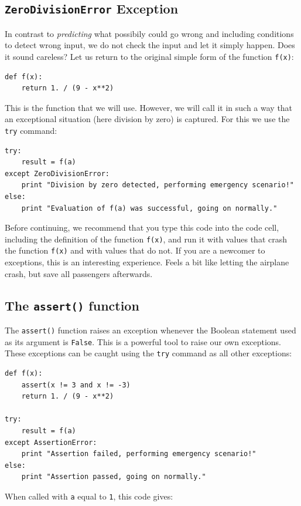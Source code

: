 \subsection{{\tt ZeroDivisionError} Exception}

In contrast 
to {\em predicting} what possibily could go wrong and including conditions to detect wrong 
input, we do not check the input and let it simply happen. Does it sound careless? Let us 
return to the original simple form of the function {\tt f(x)}:

\begin{verbatim}
def f(x):
    return 1. / (9 - x**2)
\end{verbatim}
This is the function that we will use. However, we will call it in such a way that 
an exceptional situation (here division by zero) is captured. For this we use the 
{\tt try} command:
 
\begin{verbatim}
try:
    result = f(a)
except ZeroDivisionError:
    print "Division by zero detected, performing emergency scenario!"
else:
    print "Evaluation of f(a) was successful, going on normally."
\end{verbatim}
Before continuing, we recommend that you type this code into the code cell,
including the definition of the function {\tt f(x)}, and run it with values
that crash the function {\tt f(x)} and with values that do not. If you are a newcomer to
exceptions, this is an interesting experience. Feels a bit like letting the
airplane crash, but save all passengers afterwards.
 
\subsection{The {\tt assert()} function}

The {\tt assert()} function raises an exception whenever the Boolean 
statement used as its argument is {\tt False}. This is a powerful tool to raise our own 
exceptions. These exceptions can be caught using the {\tt try} command 
as all other exceptions:

\begin{verbatim}
def f(x):
    assert(x != 3 and x != -3)
    return 1. / (9 - x**2)

try:
    result = f(a)
except AssertionError:
    print "Assertion failed, performing emergency scenario!"
else:
    print "Assertion passed, going on normally."
\end{verbatim}
When called with {\tt a} equal to {\tt 1}, this code gives:

